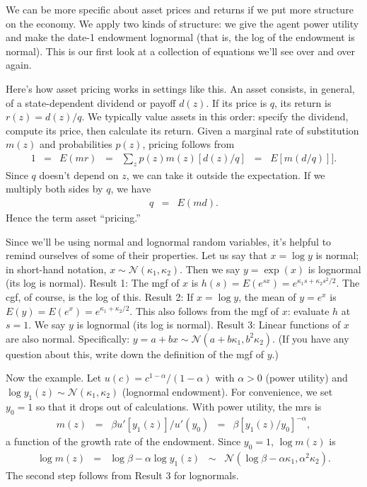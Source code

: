 \documentclass[11pt]{article}
\begin{document}
We can be more specific about asset prices and returns
if we put more structure on the economy.
We apply two kinds of structure:  we give the agent power utility
and make the date-1 endowment lognormal (that is, the log of the
endowment is normal).
This is our first look at a collection of equations we'll
see over and over again.

Here's how asset pricing works in settings like this.
An asset consists, in general,
of a state-dependent dividend or payoff $d(z)$.
If its price is $q$, its return is $ r(z) = d(z)/q$.
We typically value assets in this order:
specify the dividend, compute its price, then calculate its return.
Given a marginal rate of substitution $m(z)$ and probabilities $p(z)$,
pricing follows from
\begin{eqnarray*}
    1 &=& E (mr) \;\;=\;\; \sum_z p(z) m(z) [d(z)/q] \;\;=\;\;  E [m (d/q)]] .
\end{eqnarray*}
Since $q$ doesn't depend on $z$, we can take it outside the expectation.
If we multiply both sides by $q$, we have
\begin{eqnarray*}
    q &=& E (md)  .
\end{eqnarray*}
Hence the term asset ``pricing.''

Since we'll be using normal and lognormal random variables,
it's helpful to remind ourselves of some of their properties.
Let us say that $x = \log y$ is normal;
in short-hand notation, $ x \sim \mathcal{N}(\kappa_1,\kappa_2)$.
Then we say $y = \exp(x) $ is lognormal (its log is normal).
Result 1:  The mgf of $x$ is
$h(s) = E(e^{sx}) = e^{\kappa_1 s +\kappa_2 s^2/2}$.
The cgf, of course, is the log of this.
Result 2:  If $x = \log y$, the mean of
$y = e^x$ is $E(y) = E(e^x) = e^{\kappa_1 + \kappa_2/2}$.
This also follows from the mgf of $x$:  evaluate $h$ at $s=1$.
We say $ y$ is lognormal (its log is normal).
Result 3:  Linear functions of $x$ are also normal.
Specifically:  $ y = a + b x \sim \mathcal{N}(a + b \kappa_1, b^2 \kappa_2)$.
(If you have any question about this, write down the definition of the mgf of $y$.)


Now the example.
Let $u(c) = c^{1-\alpha}/(1-\alpha)$ with $\alpha>0$ (power utility)
and
$\log y_1(z) \sim \mathcal{N}(\kappa_1,\kappa_2)$
(lognormal endowment).
For convenience, we set $y_0 = 1$ so that it drops out of
calculations.
With power utility, the mrs is
\begin{eqnarray*}
        m(z) \;\;=\;\; {\beta u'[y_1(z)]}/{u'(y_0)} &=&  \beta [y_1(z)/y_0]^{-\alpha} ,
\end{eqnarray*}
a function of the growth rate of the endowment.
Since $y_0 = 1$, $\log m(z)$ is
\begin{eqnarray*}
    \log m(z) &=& \log \beta - \alpha \log y_1(z)
        \;\;\sim\;\; \mathcal{N}(\log \beta - \alpha \kappa_1, \alpha^2 \kappa_2).
\end{eqnarray*}
The second step follows from Result 3 for lognormals.
\end{document}
